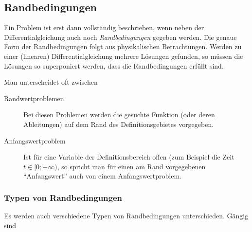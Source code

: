 \documentclass[paper=a4, fontsize=11.0pt, abstractoff, DIV12]{scrartcl}
\begin{document}
\subsection{Randbedingungen}

Ein Problem ist erst dann vollständig beschrieben, wenn neben der
Differentialgleichung auch noch \emph{Randbedingungen} gegeben werden. Die
genaue Form der Randbedingungen folgt aus physikalischen Betrachtungen.
Werden zu einer (linearen) Differentialgleichung mehrere Lösungen gefunden,
so müssen die Lösungen so superponiert werden, dass die Randbedingungen
erfüllt sind.

Man unterscheidet oft zwischen
\begin{description}
    \item[Randwertproblemen] Bei diesen Problemen werden die gesuchte Funktion (oder deren Ableitungen) auf dem Rand des Definitionsgebietes vorgegeben.
    \item[Anfangswertproblem] Ist für eine Variable der Definitionsbereich
    offen (zum Beispiel die Zeit $t\in[0; +\infty)$, so spricht man für
    einen am Rand vorgegebenen ``Anfangswert'' auch von einem
    Anfangswertproblem.
\end{description}

\subsubsection{Typen von Randbedingungen}

Es werden auch verschiedene Typen von Randbedingungen unterschieden. Gängig sind
\end{document}
